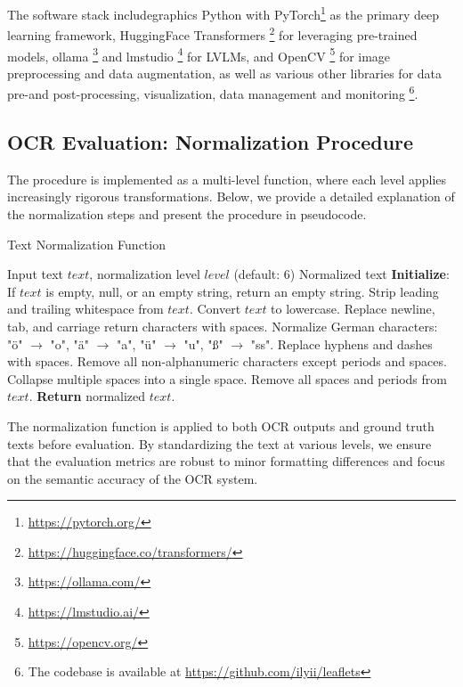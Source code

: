 \documentclass[11pt]{article}
\begin{document}
The software stack includegraphics Python with PyTorch\footnote{\href{https://pytorch.org/}{https://pytorch.org/}} as the primary deep learning framework, HuggingFace Transformers \footnote{\href{https://huggingface.co/transformers/}{https://huggingface.co/transformers/}}
for leveraging pre-trained models, ollama \footnote{\href{https://ollama.com/}{https://ollama.com/}}
and lmstudio \footnote{\href{https://lmstudio.ai/}{https://lmstudio.ai/}} for LVLMs, and OpenCV \footnote{\href{https://opencv.org/}{https://opencv.org/}} for image preprocessing and data augmentation, as well as various other libraries for data pre-and post-processing, visualization, data management and monitoring \footnote{The codebase is available at \href{https://github.com/ilyii/leaflets}{https://github.com/ilyii/leaflets}}.

\subsection{OCR Evaluation: Normalization Procedure}
\label{app:ocr_normalization}
The procedure is implemented as a multi-level function, where each level applies increasingly rigorous transformations. Below, we provide a detailed explanation of the normalization steps and present the procedure in pseudocode.

\begin{algorithm}[H]
\caption{Text Normalization Function}
\label{alg:normalization}
\begin{algorithmic}[1]
\Require Input text $text$, normalization level $level$ (default: 6)
\Ensure Normalized text
\State \textbf{Initialize}: If $text$ is empty, null, or an empty string, return an empty string.
    \State Strip leading and trailing whitespace from $text$.
\EndIf
{}
    \State Convert $text$ to lowercase.
    \State Replace newline, tab, and carriage return characters with spaces.
    \State Normalize German characters: "ö" $\rightarrow$ "o", "ä" $\rightarrow$ "a", "ü" $\rightarrow$ "u", "ß" $\rightarrow$ "ss".
\EndIf
{}
    \State Replace hyphens and dashes  with spaces.
    \State Remove all non-alphanumeric characters except periods and spaces.
    \State Collapse multiple spaces into a single space.
\EndIf
{}
    \State Remove all spaces and periods from $text$.
\EndIf
\State \textbf{Return} normalized $text$.
\end{algorithmic}
\end{algorithm}

The normalization function is applied to both OCR outputs and ground truth texts before evaluation. By standardizing the text at various levels, we ensure that the evaluation metrics are robust to minor formatting differences and focus on the semantic accuracy of the OCR system.
\end{document}
